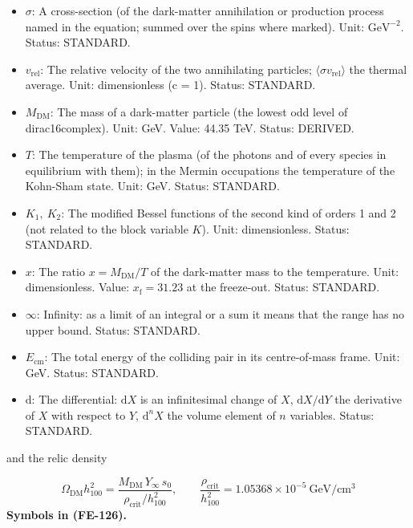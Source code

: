 \documentclass[
  10pt,
]{article}
\providecommand{\tightlist}{%
  \setlength{\itemsep}{0pt}\setlength{\parskip}{0pt}}
\begin{document}
\begin{itemize}
\tightlist
\item
  \(\sigma\): A cross-section (of the dark-matter annihilation or
  production process named in the equation; summed over the spins where
  marked). Unit: \(\mathrm{GeV}^{-2}\). Status: STANDARD.
\item
  \(v_{\mathrm{rel}}\): The relative velocity of the two annihilating
  particles; \(\langle\sigma v_{\mathrm{rel}}\rangle\) the thermal
  average. Unit: dimensionless (c = 1). Status: STANDARD.
\item
  \(M_{\mathrm{DM}}\): The mass of a dark-matter particle (the lowest
  odd level of dirac16complex). Unit: GeV. Value: 44.35 TeV. Status:
  DERIVED.
\item
  \(T\): The temperature of the plasma (of the photons and of every
  species in equilibrium with them); in the Mermin occupations the
  temperature of the Kohn-Sham state. Unit: GeV. Status: STANDARD.
\item
  \(K_1,\ K_2\): The modified Bessel functions of the second kind of
  orders 1 and 2 (not related to the block variable \(K\)). Unit:
  dimensionless. Status: STANDARD.
\item
  \(x\): The ratio \(x = M_{\mathrm{DM}}/T\) of the dark-matter mass to
  the temperature. Unit: dimensionless. Value:
  \(x_{\mathrm{f}} = 31.23\) at the freeze-out. Status: STANDARD.
\item
  \(\infty\): Infinity: as a limit of an integral or a sum it means that
  the range has no upper bound. Status: STANDARD.
\item
  \(E_{\mathrm{cm}}\): The total energy of the colliding pair in its
  centre-of-mass frame. Unit: GeV. Status: STANDARD.
\item
  \(\mathrm{d}\): The differential: \(\mathrm{d}X\) is an infinitesimal
  change of \(X\), \(\mathrm{d}X/\mathrm{d}Y\) the derivative of \(X\)
  with respect to \(Y\), \(\mathrm{d}^nX\) the volume element of \(n\)
  variables. Status: STANDARD.
\end{itemize}

and the relic density

\[
\Omega_{\mathrm{DM}}h_{100}^2 = \frac{M_{\mathrm{DM}}\,Y_\infty\,s_0}{\rho_{\mathrm{crit}}/h_{100}^2},\qquad
\frac{\rho_{\mathrm{crit}}}{h_{100}^2} = 1.05368\times10^{-5}\ \text{GeV}/\text{cm}^3 \tag{FE-126}
\] \textbf{Symbols in (FE-126).}
\end{document}
